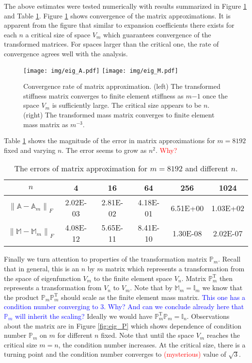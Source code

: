 \documentclass[a4paper,10pt]{article}
\newcommand{\norm}[1]{\ensuremath{\left\|#1\right\|}}
\newcommand{\Amat}{\ensuremath{\mathbb{A}}}
\newcommand{\Mmat}{\ensuremath{\mathbb{M}}}
\newcommand{\Ammat}{\ensuremath{\mathbb{A}_m}}               %
\newcommand{\Mmmat}{\ensuremath{\mathbb{M}_m}}               %
\newcommand{\Pmat}{\ensuremath{\mathbb{P}_m}}                  %
\newcommand{\Pmatt}{\ensuremath{\mathbb{P}_m^{\text{T}}}}       %
\newcommand{\TODO}[1]{\textcolor{red}{#1}}
\newcommand{\ASK}[1]{\textcolor{blue}{#1}}
\begin{document}
  The above estimates were tested numerically with results summarized in Figure
  \ref{fig:eig_mat} and Table \ref{tab:eig_mat}. Figure \ref{fig:eig_mat} shows
  convergence of the matrix
  approximations. It is apparent from the figure that similar to expansion
  coefficients there exists for each $n$ a critical size of space $V_m$ which
  guarantees convergence of the transformed matrices. For spaces larger than
  the critical one, the rate of convergence agrees well with the analysis. 
  \begin{figure}
  \begin{center}
    \texttt{[image: img/eig\_A.pdf]}
    \texttt{[image: img/eig\_M.pdf]}
  \end{center}
  \label{fig:eig_mat}
  \caption{Convergence rate of matrix approximation. (left) The transformed
  stiffness matrix converges to finite element stiffness as $m{-1}$ once the
  space $V_m$ is sufficiently large. The critical size appears to be $n$.
  (right) The transformed mass matrix converges to finite element mass matrix
  as $m^{-3}$.
  }
  \end{figure}
  Table \ref{tab:eig_mat} shows the magnitude of the error in matrix
  approximations for $m=8192$ fixed and varying $n$. The error seems to grow
  as $n^2$. \TODO{Why?}
  \begin{table}
    \begin{center}
    \begin{tabular}{|c||c|c|c|c|c|}
      \hline
$n$ &  4& 16& 64& 256& 1024\\
      \hline\hline
$\norm{\Amat-\Ammat}_F$ & 2.02E-03& 2.81E-02& 4.18E-01& 6.51E+00& 1.03E+02 \\
      \hline
$\norm{\Mmat-\Mmmat}_F$ & 4.08E-12& 5.65E-11& 8.41E-10& 1.30E-08& 2.02E-07 \\
      \hline
    \end{tabular}
  \caption{The errors of matrix approximation for $m=8192$ and different $n$.}
  \label{tab:eig_mat}
  \end{center}
  \end{table}

  Finally we turn attention to properties of the transformation matrix $\Pmat$.
  Recall that in general, this is an $n$ by $m$ matrix which represents a
  transformation from the space of eigenfunction $V_m$ to the finite element 
  space $V_n$. Matrix $\Pmatt$ then represents a transformation from $V_n$ 
  to $V_m$. Note that by $\Mmmat=\mathbb{I}_m$ we know that the product 
  $\Pmat\Pmatt$ should scale as the finite element mass matrix. \ASK{This
  one has a condition number converging to 3. Why? And can we conclude already
here that $\Pmat$ will inherit the scaling?} Ideally we would have
$\Pmatt\Pmat=\mathbb{I}_n$. Observations about the matrix are in Figure
\ref{fig:eig_P} which shows dependence of condition number $\Pmat$ on $m$
  for different $n$ fixed. Note that until the space $V_m$ reaches the critical
  size $m=n$, the condition number increases. At the critical size, there is a
  turning point and the condition number converges to \TODO{(mysterious)} value
  of $\sqrt{3}$.
  
\end{document}
